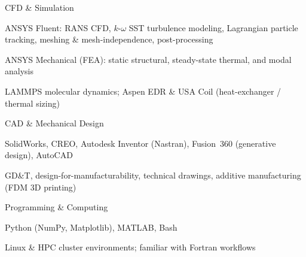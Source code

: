   \begin{cventries}

    \cventry
      {CFD \& Simulation}{}{}{}
      {
        \begin{cvitems}
          \item {ANSYS Fluent: RANS CFD, $k$-$\omega$ SST turbulence modeling, Lagrangian particle tracking, meshing \& mesh-independence, post-processing}
          \item {ANSYS Mechanical (FEA): static structural, steady-state thermal, and modal analysis}
          \item {LAMMPS molecular dynamics; Aspen EDR \& USA Coil (heat-exchanger / thermal sizing)}
        \end{cvitems}
      }
    \vspace{-3.5mm}

    \cventry
      {CAD \& Mechanical Design}{}{}{}
      {
        \begin{cvitems}
          \item {SolidWorks, CREO, Autodesk Inventor (Nastran), Fusion~360 (generative design), AutoCAD}
          \item {GD\&T, design-for-manufacturability, technical drawings, additive manufacturing (FDM 3D printing)}
        \end{cvitems}
      }
    \vspace{-3.5mm}

    \cventry
      {Programming \& Computing}{}{}{}
      {
        \begin{cvitems}
          \item {Python (NumPy, Matplotlib), MATLAB, Bash}
          \item {Linux \& HPC cluster environments; familiar with Fortran workflows}
        \end{cvitems}
      }
    \vspace{-3.5mm}

  \end{cventries}